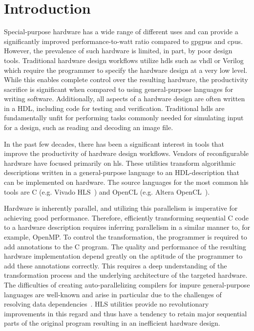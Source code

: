 \chapter{Introduction}

Special-purpose hardware has a wide range of different uses and can provide a
significantly improved performance-to-watt ratio compared to \glspl{gpgpu} and
\glspl{cpu}. However, the prevalence of such hardware is limited, in part, by
poor design tools. Traditional hardware design workflows utilize
\glspl{hdl} such as \gls{vhdl} or Verilog
which require the programmer to specify the hardware design at a very low
level. While this enables complete control over the resulting hardware, the
productivity sacrifice is significant when compared to using general-purpose
languages for writing software. Additionally, all aspects of a hardware design
are often written in a HDL, including code for testing and
verification. Traditional \glspl{hdl} are fundamentally unfit for performing tasks
commonly needed for simulating input for a design, such as reading and decoding
an image file.%

In the past few decades, there has been a significant interest in tools that
improve the productivity of hardware design workflows. Vendors of reconfigurable
hardware have focused primarily on \gls{hls}. These
utilities transform algorithmic descriptions written in a general-purpose
language to an HDL-description that can be implemented on hardware. The source
languages for the most common \gls{hls} tools are C (e.g. Vivado HLS~\cite{vivadohls})
and OpenCL (e.g. Altera OpenCL~\cite{aocl}).

Hardware is inherently parallel, and utilizing this parallelism is imperative
for achieving good performance. Therefore, efficiently transforming sequential C
code to a hardware description requires inferring parallelism in a similar
manner to, for example, OpenMP. To control the transformation, the programmer is
required to add annotations to the C program. The quality and performance of the
resulting hardware implementation depend greatly on the aptitude of the
programmer to add these annotations correctly. This requires a deep
understanding of the transformation process and the underlying architecture of
the targeted hardware. The difficulties of creating auto-parallelizing compilers
for impure general-purpose languages are well-known and arise in particular due
to the challenges of resolving data
dependencies~\cite{banerjee1976data,bodik2000abcd}. HLS utilities provide no
revolutionary improvements in this regard and thus have a tendency to retain
major sequential parts of the original program resulting in an inefficient
hardware design.

